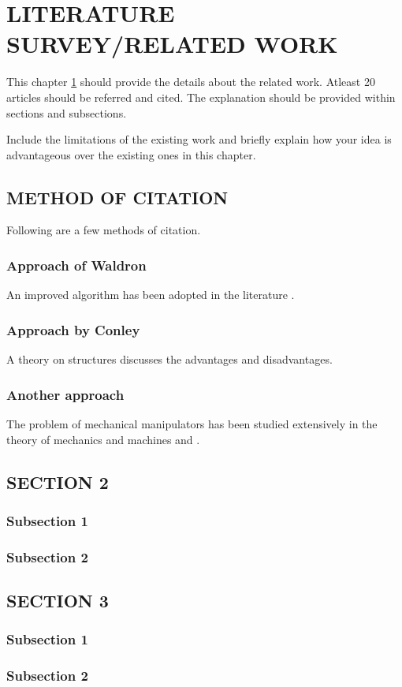 
\chapter{\uppercase{Literature Survey/Related Work}} %
\label{ch:survey} %

This chapter \ref{ch:survey} should provide the details about the related work. Atleast 20 articles should be referred and cited. The explanation should be provided within sections and subsections.

Include the limitations of the existing work and briefly explain how your idea is advantageous over the existing ones in this chapter.
\section{\uppercase{Method of Citation}}
Following are a few methods of citation.
\subsection{Approach of Waldron}
An improved algorithm has been adopted in the literature \cite{factors}. 

\subsection{Approach by Conley}
A theory \cite{conley} on structures discusses the advantages and disadvantages. 

\subsection{Another approach}
The problem of mechanical manipulators has been studied extensively in the theory of mechanics and machines \cite{holt} and \cite{waldron}.

\section{\uppercase{Section 2}}

\subsection{Subsection 1}

\subsection{Subsection 2}

\section{\uppercase{Section 3}}

\subsection{Subsection 1}

\subsection{Subsection 2}
